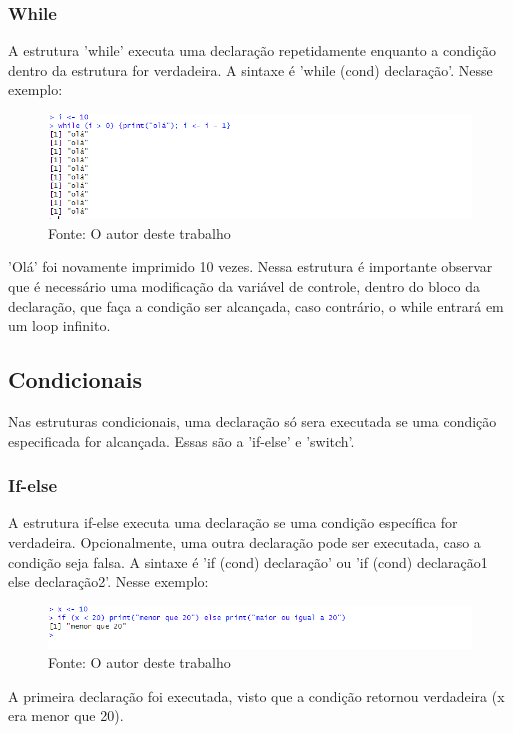   		\subsubsection{While}
  			A estrutura 'while' executa uma declaração repetidamente enquanto a condição dentro da estrutura for verdadeira. A sintaxe é 'while (cond) declaração'. Nesse exemplo:\begin{figure}[H]
  				\centering
  				\caption{}
  				\includegraphics[width=1.0\linewidth]{Prints/screenshot010}
  				\label{fig:screenshot010}
  				{\tiny \sf Fonte: O autor deste trabalho }
  			\end{figure}
  			'Olá' foi novamente imprimido 10 vezes. Nessa estrutura é importante observar que é necessário uma modificação da variável de controle, dentro do bloco da declaração, que faça a condição ser alcançada, caso contrário, o while entrará em um loop infinito.
  	\subsection{Condicionais}
  		Nas estruturas condicionais, uma declaração só sera executada se uma condição especificada for alcançada. Essas são a 'if-else' e 'switch'.
  		\subsubsection{If-else}
  			A estrutura if-else executa uma declaração se uma condição específica for verdadeira. Opcionalmente, uma outra declaração pode ser executada, caso a condição seja falsa. A sintaxe é 'if (cond) declaração' ou 'if (cond) declaração1 else declaração2'. Nesse exemplo:\begin{figure}[H]
  				\centering
  				\caption{}
  				\includegraphics[width=1.0\linewidth]{Prints/screenshot011}
  				\label{fig:screenshot011}
  				{\tiny \sf Fonte: O autor deste trabalho }
  			\end{figure}
  			A primeira declaração foi executada, visto que a condição retornou verdadeira (x era menor que 20).

